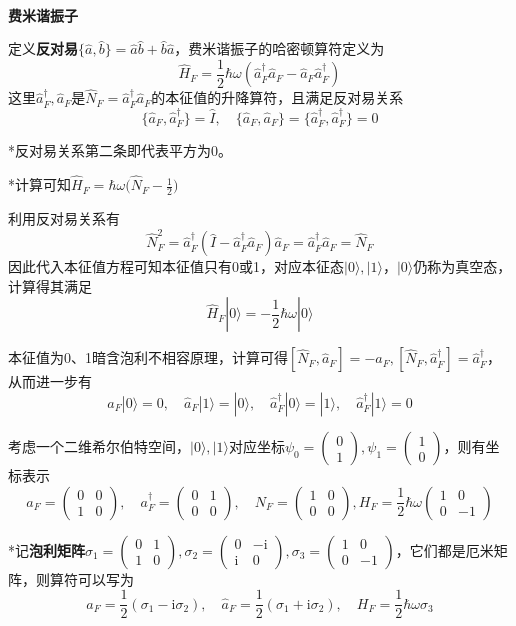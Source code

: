 \documentclass[a4paper,UTF8,fontset=windows]{ctexart}
\newcommand*{\ir}{\mathrm{i}}
\newcommand*{\ket}[1]{|#1\rangle}
\begin{document}
\

\textbf{费米谐振子}

定义\textbf{反对易}$\{\hat{a},\hat{b}\}=\hat{a}\hat{b}+\hat{b}\hat{a}$，费米谐振子的哈密顿算符定义为
$$\hat{H}_F=\frac{1}{2}\hbar\omega(\hat{a}_F^\dagger\hat{a}_F-\hat{a}_F\hat{a}_F^\dagger)$$
这里$\hat{a}_F^\dagger,\hat{a}_F$是$\hat{N}_F=\hat{a}_F^\dagger\hat{a}_F$的本征值的升降算符，且满足反对易关系
$$\{\hat{a}_F,\hat{a}_F^\dagger\}=\hat{I},\quad\{\hat{a}_F,\hat{a}_F\}=\{\hat{a}_F^\dagger,\hat{a}_F^\dagger\}=0$$

*反对易关系第二条即代表平方为0。

*计算可知$\hat{H}_F=\hbar\omega\big(\hat{N}_F-\frac{1}{2}\big)$

利用反对易关系有
$$\hat{N}_F^2=\hat{a}_F^\dagger(\hat{I}-\hat{a}_F^\dagger\hat{a}_F)\hat{a}_F=\hat{a}_F^\dagger\hat{a}_F=\hat{N}_F$$
因此代入本征值方程可知本征值只有0或1，对应本征态$\ket{0},\ket{1}$，$\ket{0}$仍称为真空态，计算得其满足
$$\hat{H}_F\ket{0}=-\frac{1}{2}\hbar\omega\ket{0}$$

本征值为0、1暗含泡利不相容原理，计算可得$[\hat{N}_F,\hat{a}_F]=-\hat{a}_F,[\hat{N}_F,\hat{a}_F^\dagger]=\hat{a}_F^\dagger$，从而进一步有
$$\hat{a}_F\ket{0}=0,\quad\hat{a}_F\ket{1}=\ket{0},\quad\hat{a}_F^\dagger\ket{0}=\ket{1},\quad\hat{a}_F^\dagger\ket{1}=0$$

考虑一个二维希尔伯特空间，$\ket{0},\ket{1}$对应坐标$\psi_0=\begin{pmatrix}0\\1\end{pmatrix},\psi_1=\begin{pmatrix}1\\0\end{pmatrix}$，则有坐标表示
$$a_F=\begin{pmatrix}0&0\\1&0\end{pmatrix},\quad a_F^\dagger=\begin{pmatrix}0&1\\0&0\end{pmatrix},\quad N_F=\begin{pmatrix}1&0\\0&0\end{pmatrix},H_F=\frac{1}{2}\hbar\omega\begin{pmatrix}1&0\\0&-1\end{pmatrix}$$

*记\textbf{泡利矩阵}$\sigma_1=\begin{pmatrix}0&1\\1&0\end{pmatrix},\sigma_2=\begin{pmatrix}0&-\ir\\\ir&0\end{pmatrix},\sigma_3=\begin{pmatrix}1&0\\0&-1\end{pmatrix}$，它们都是厄米矩阵，则算符可以写为$$a_F=\frac{1}{2}(\sigma_1-\ir\sigma_2),\quad\hat{a}_F=\frac{1}{2}(\sigma_1+\ir\sigma_2),\quad H_F=\frac{1}{2}\hbar\omega\sigma_3$$
\end{document}
